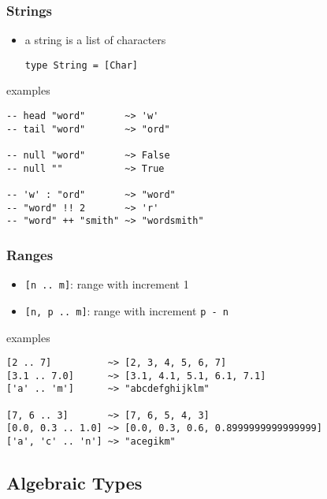 \documentclass[dvipsnames]{beamer}
\theoremstyle{plain}
\begin{document}
\begin{frame}[fragile]
  \frametitle{Strings}

  \begin{itemize}
   \item a string is a list of characters
    \begin{lstlisting}
type String = [Char]
    \end{lstlisting}
  \end{itemize}

  \begin{exampleblock}{examples}
    \begin{lstlisting}
-- head "word"       ~> 'w'
-- tail "word"       ~> "ord"

-- null "word"       ~> False
-- null ""           ~> True

-- 'w' : "ord"       ~> "word"
-- "word" !! 2       ~> 'r'
-- "word" ++ "smith" ~> "wordsmith"
    \end{lstlisting}
  \end{exampleblock}
\end{frame}

\begin{frame}[fragile]
  \frametitle{Ranges}

  \begin{itemize}
    \item \lstinline|[n .. m]|: range with increment 1
    \item \lstinline|[n, p .. m]|: range with increment \texttt{p - n}
  \end{itemize}

  \begin{exampleblock}{examples}
    \begin{lstlisting}
[2 .. 7]          ~> [2, 3, 4, 5, 6, 7]
[3.1 .. 7.0]      ~> [3.1, 4.1, 5.1, 6.1, 7.1]
['a' .. 'm']      ~> "abcdefghijklm"

[7, 6 .. 3]       ~> [7, 6, 5, 4, 3]
[0.0, 0.3 .. 1.0] ~> [0.0, 0.3, 0.6, 0.8999999999999999]
['a', 'c' .. 'n'] ~> "acegikm"
    \end{lstlisting}
  \end{exampleblock}
\end{frame}

\subsection{Algebraic Types}
\end{document}
